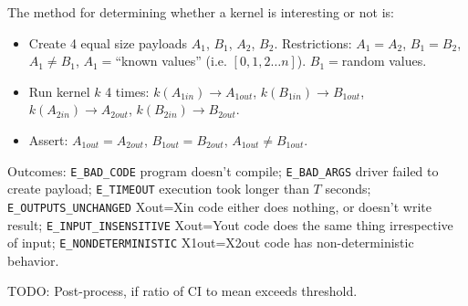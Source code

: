 \documentclass[preprint,nonatbib,10pt,nocopyrightspace]{sigplanconf}
\begin{document}
The method for determining whether a kernel is interesting or not is:

\begin{itemize}
\item Create 4 equal size payloads $A_1$, $B_1$, $A_2$, $B_2$.
  Restrictions: $A_1=A_2$, $B_1=B_2$, $A_1 \ne B_1$, $A_1 =$“known
  values” (i.e. $\left[0, 1, 2 \ldots n\right]$). $B_1=$random values.
\item Run kernel $k$ 4 times: $k(A_{1in}) \rightarrow A_{1out}$,
  $k(B_{1in}) \rightarrow B_{1out}$,
  $k(A_{2in}) \rightarrow A_{2out}$,
  $k(B_{2in}) \rightarrow B_{2out}$.
\item Assert: $A_{1out}=A_{2out}$, $B_{1out}=B_{2out}$,
  $A_{1out} \ne B_{1out}$.
\end{itemize}

Outcomes: \texttt{E\_BAD\_CODE} program doesn’t compile;
\texttt{E\_BAD\_ARGS} driver failed to create payload;
\texttt{E\_TIMEOUT} execution took longer than $T$ seconds;
\texttt{E\_OUTPUTS\_UNCHANGED} Xout=Xin code either does nothing, or
doesn’t write result; \texttt{E\_INPUT\_INSENSITIVE} Xout=Yout code
does the same thing irrespective of input;
\texttt{E\_NONDETERMINISTIC} X1out=X2out code has non-deterministic
behavior.


TODO: Post-process, if ratio of CI to mean exceeds threshold.




\end{document}
